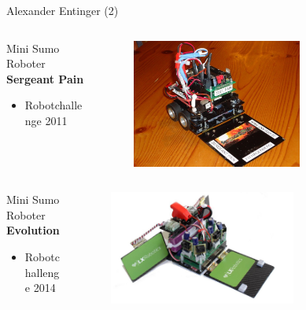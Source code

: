 \documentclass{beamer}
\begin{document}
\begin{frame}{Alexander Entinger (2)}
\begin{columns}
 \begin{column}{0.5\textwidth}
  \begin{large}Mini Sumo Roboter \textbf{Sergeant Pain}\end{large}
  \begin{itemize}
   \item Robotchallenge 2011
  \end{itemize}
 \end{column}
 \begin{column}{0.5\textwidth}
  \begin{figure}[H]
   \centering
   \includegraphics[width=0.7\textwidth]{./images/robot-sergeant-pain.jpg}
   \label{fig:robot-sergeant-pain}
  \end{figure}
 \end{column}
\end{columns}

\begin{columns}
 \begin{column}{0.5\textwidth}
  \begin{large}Mini Sumo Roboter \textbf{Evolution}\end{large}
  \begin{itemize}
   \item Robotchallenge 2014
  \end{itemize}
 \end{column}
 \begin{column}{0.5\textwidth}
  \begin{figure}[H]
   \centering
   \includegraphics[width=0.7\textwidth]{./images/robot-evolution.jpg}
   \label{fig:robot-evolution}
  \end{figure}
 \end{column}
\end{columns}
\end{frame}
\end{document}
